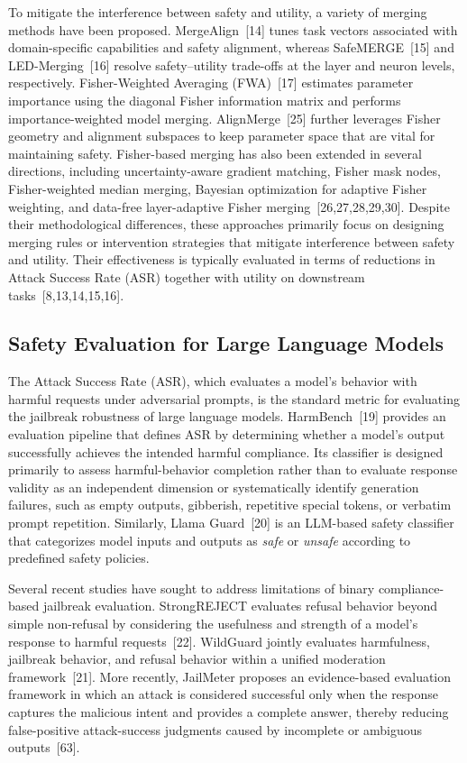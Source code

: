 \documentclass{article}
\begin{document}
To mitigate the interference between safety and utility, a variety of merging methods have been proposed. MergeAlign~[14] tunes task vectors associated with domain-specific capabilities and safety alignment, whereas SafeMERGE~[15] and LED-Merging~[16] resolve safety--utility trade-offs at the layer and neuron levels, respectively. Fisher-Weighted Averaging (FWA)~[17] estimates parameter importance using the diagonal Fisher information matrix and performs importance-weighted model merging. AlignMerge~[25] further leverages Fisher geometry and alignment subspaces to keep parameter space that are vital for maintaining safety.
Fisher-based merging has also been extended in several directions, including uncertainty-aware gradient matching, Fisher mask nodes, Fisher-weighted median merging, Bayesian optimization for adaptive Fisher weighting, and data-free layer-adaptive Fisher merging~[26,27,28,29,30].
Despite their methodological differences, these approaches primarily focus on designing merging rules or intervention strategies that mitigate interference between safety and utility. Their effectiveness is typically evaluated in terms of reductions in Attack Success Rate (ASR) together with utility on downstream tasks~[8,13,14,15,16].


\subsection{Safety Evaluation for Large Language Models}
The Attack Success Rate (ASR), which evaluates a model's behavior with harmful requests under adversarial prompts, is the standard metric for evaluating the jailbreak robustness of large language models. HarmBench~[19] provides an evaluation pipeline that defines ASR by determining whether a model's output successfully achieves the intended harmful compliance. Its classifier is designed primarily to assess harmful-behavior completion rather than to evaluate response validity as an independent dimension or systematically identify generation failures, such as empty outputs, gibberish, repetitive special tokens, or verbatim prompt repetition. Similarly, Llama Guard~[20] is an LLM-based safety classifier that categorizes model inputs and outputs as \textit{safe} or \textit{unsafe} according to predefined safety policies.


Several recent studies have sought to address limitations of binary compliance-based jailbreak evaluation. StrongREJECT evaluates refusal behavior beyond simple non-refusal by considering the usefulness and strength of a model's response to harmful requests~[22]. WildGuard jointly evaluates harmfulness, jailbreak behavior, and refusal behavior within a unified moderation framework~[21]. More recently, JailMeter proposes an evidence-based evaluation framework in which an attack is considered successful only when the response captures the malicious intent and provides a complete answer, thereby reducing false-positive attack-success judgments caused by incomplete or ambiguous outputs~[63].
\end{document}
